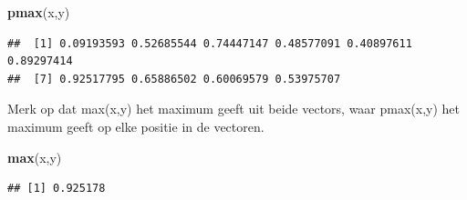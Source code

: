 \documentclass[]{tufte-book}
\newenvironment{Shaded}{}{}
\newcommand{\DataTypeTok}[1]{\textcolor[rgb]{0.56,0.13,0.00}{#1}}
\newcommand{\DecValTok}[1]{\textcolor[rgb]{0.25,0.63,0.44}{#1}}
\newcommand{\KeywordTok}[1]{\textcolor[rgb]{0.00,0.44,0.13}{\textbf{#1}}}
\newcommand{\NormalTok}[1]{#1}
\newcommand{\OperatorTok}[1]{\textcolor[rgb]{0.40,0.40,0.40}{#1}}
\newcommand{\StringTok}[1]{\textcolor[rgb]{0.25,0.44,0.63}{#1}}
\begin{document}
\begin{Shaded}
\begin{Highlighting}[]
\KeywordTok{pmax}\NormalTok{(x,y)}
\end{Highlighting}
\end{Shaded}

\begin{verbatim}
##  [1] 0.09193593 0.52685544 0.74447147 0.48577091 0.40897611 0.89297414
##  [7] 0.92517795 0.65886502 0.60069579 0.53975707
\end{verbatim}

Merk op dat max(x,y) het maximum geeft uit beide vectors, waar pmax(x,y) het maximum geeft op elke positie in de vectoren.

\begin{Shaded}
\begin{Highlighting}[]
\KeywordTok{max}\NormalTok{(x,y)}
\end{Highlighting}
\end{Shaded}

\begin{verbatim}
## [1] 0.925178
\end{verbatim}

\begin{Shaded}
\end{Shaded}
\end{document}
